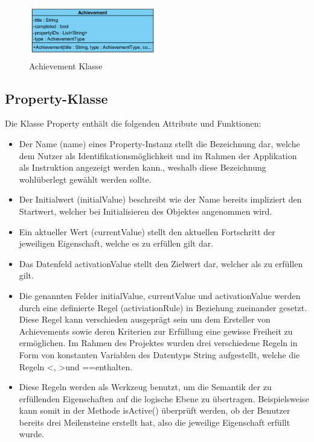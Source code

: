 \documentclass[bibliography=totoc,listof=totoc,BCOR=5mm,DIV=12,oneside]{scrbook}
\begin{document}
\begin{figure}[H]
	\centering
	\includegraphics[width=0.5\textwidth, keepaspectratio]{Bilder/ClassAchievement.png}
	\caption{Achievement Klasse}
	\label{img:achievementClass}
\end{figure}

\newpage
\subsection{Property-Klasse}
\label{sub:propertyclass}
\par \medskip Die Klasse Property enthält die folgenden Attribute und Funktionen:

\begin{itemize}
\item \par Der Name (name) eines Property-Instanz stellt die Bezeichnung dar, welche dem Nutzer als Identifikationsmöglichkeit und im Rahmen der Applikation als Instruktion angezeigt werden kann., weshalb diese Bezeichnung wohlüberlegt gewählt werden sollte. 
\item \par Der Initialwert (initialValue) beschreibt wie der Name bereits impliziert den Startwert, welcher bei Initialisieren des Objektes angenommen wird.
\item \par Ein aktueller Wert (currentValue) stellt den aktuellen Fortschritt der jeweiligen Eigenschaft, welche es zu erfüllen gilt dar. 
\item \par Das Datenfeld activationValue stellt den Zielwert dar, welcher als zu erfüllen gilt.
\item \par Die genannten Felder initialValue, currentValue und activationValue werden durch eine definierte Regel (activiationRule) in Beziehung zueinander gesetzt. Diese Regel kann verschieden ausgeprägt sein um dem Ersteller von Achievements sowie deren Kriterien zur Erfüllung eine gewisse Freiheit zu ermöglichen. Im Rahmen des Projektes wurden drei verschiedene Regeln in Form von konstanten Variablen des Datentyps String aufgestellt, welche die Regeln \grqq <\grqq, \grqq >\grqq und \grqq ==\grqq enthalten. 
\item \par Diese Regeln werden als Werkzeug benutzt, um die Semantik der zu erfüllenden Eigenschaften auf die logische Ebene zu übertragen.
Beispielsweise kann somit in der Methode isActive() überprüft werden, ob der Benutzer bereits drei Meilensteine erstellt hat, also die jeweilige Eigenschaft erfüllt wurde.
\end{itemize}
\end{document}
